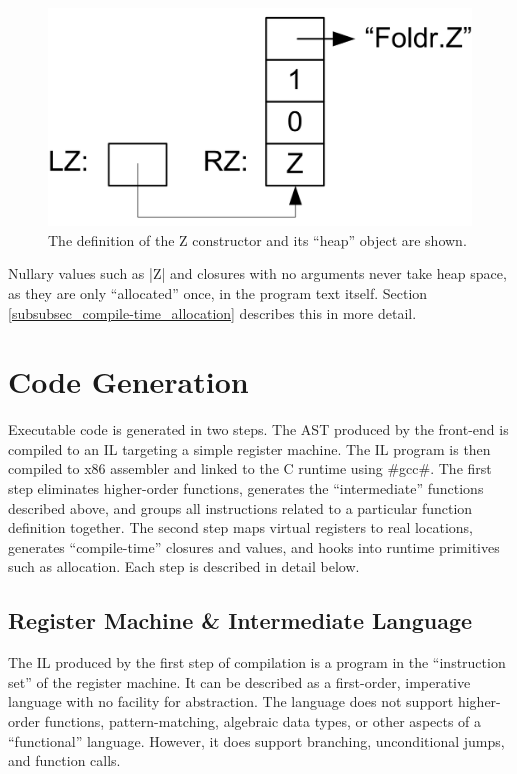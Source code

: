 \documentclass[11pt]{article}
\begin{document}
\begin{figure}\centering
\includegraphics{fig_HeapZDef}
\caption{The definition of the Z constructor and its ``heap'' object are
  shown.}
\label{fig_HeapZDef}
\end{figure}

Nullary values such as |Z| and closures with no arguments never take
heap space, as they are only ``allocated'' once, in the program
text itself. Section \ref{subsubsec_compile-time_allocation} describes
this in more detail.

\section{Code Generation}
\label{sec_code_generation}

Executable code is generated in two steps. The AST produced by the
front-end is compiled to an IL targeting a simple
register machine. The IL program is then compiled
to x86 assembler and linked to the C runtime using #gcc#. The first
step eliminates higher-order functions, generates the ``intermediate''
functions described above, and groups all instructions related to a
particular function definition together. The second step maps virtual
registers to real locations, generates ``compile-time'' closures and
values, and hooks into runtime primitives such as allocation. Each
step is described in detail below.

\subsection{Register Machine \& Intermediate Language}

The IL produced by the first step of
compilation is a program in the ``instruction set'' of the register
machine. It can be described as a first-order, imperative language
with no facility for abstraction. The language does not support
higher-order functions, pattern-matching, algebraic data types, or
other aspects of a ``functional'' language. However, it does support
branching, unconditional jumps, and function calls. 
\end{document}
